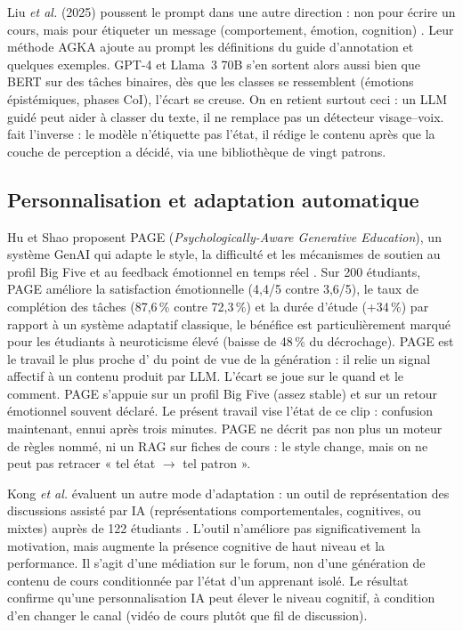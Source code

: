Liu \emph{et al.} (2025) poussent le prompt dans une autre direction : non
pour écrire un cours, mais pour étiqueter un message (comportement,
émotion, cognition) \cite{liu2025agka}. Leur méthode AGKA ajoute au prompt
les définitions du guide d'annotation et quelques exemples. GPT-4 et
Llama~3 70B s'en sortent alors aussi bien que BERT sur des tâches binaires, 
dès que les classes se ressemblent (émotions épistémiques, phases CoI),
l'écart se creuse. On en retient surtout ceci : un LLM guidé peut aider à
classer du texte, il ne remplace pas un détecteur visage--voix.
\emolearn{} fait l'inverse : le modèle n'étiquette pas l'état, il rédige
le contenu après que la couche de perception a décidé, via une
bibliothèque de vingt patrons.

\subsection{Personnalisation et adaptation automatique}

Hu et Shao proposent PAGE (\emph{Psychologically-Aware Generative Education}),
un système GenAI qui adapte le style, la difficulté et les mécanismes de
soutien au profil Big Five et au feedback émotionnel en temps réel
\cite{hu2025page}. Sur 200 étudiants, PAGE améliore la satisfaction
émotionnelle (4,4/5 contre 3,6/5), le taux de complétion des tâches
(87,6\,\% contre 72,3\,\%) et la durée d'étude (+34\,\%) par rapport à un
système adaptatif classique, le bénéfice est particulièrement marqué pour
les étudiants à neuroticisme élevé (baisse de 48\,\% du décrochage). PAGE
est le travail le plus proche d'\emolearn{} du point de vue de la génération : il relie un signal affectif à un contenu produit par
LLM. L'écart se joue sur le quand et le comment. PAGE s'appuie sur
un profil Big Five (assez stable) et sur un retour émotionnel souvent
déclaré. Le présent travail vise l'état de ce clip : confusion
maintenant, ennui après trois minutes. PAGE ne décrit pas non plus un
moteur de règles nommé, ni un RAG sur fiches de cours : le style change,
mais on ne peut pas retracer « tel état $\rightarrow$ tel patron ».

Kong \emph{et al.} évaluent un autre mode d'adaptation : un outil de
représentation des discussions assisté par IA (représentations
comportementales, cognitives, ou mixtes) auprès de 122 étudiants
\cite{kong2025exploratory}. L'outil n'améliore pas significativement la
motivation, mais augmente la présence cognitive de haut niveau et la
performance. Il s'agit d'une médiation sur le forum, non d'une
génération de contenu de cours conditionnée par l'état d'un apprenant
isolé. Le résultat confirme qu'une personnalisation IA peut élever le
niveau cognitif, à condition d'en changer le canal (vidéo de cours plutôt
que fil de discussion).


